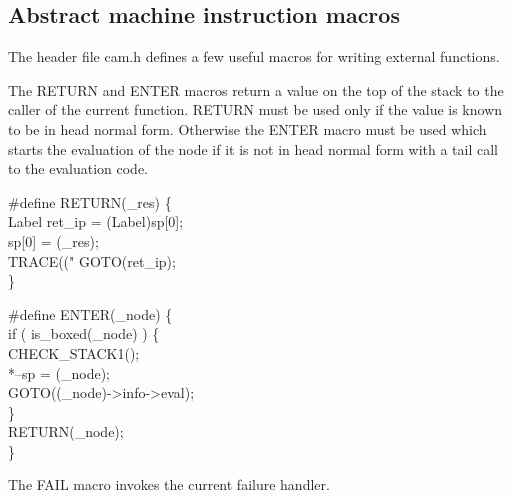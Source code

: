 %
%
\subsection{Abstract machine instruction macros}
The header file {\Tt{}cam.h\nwendquote} defines a few useful macros for writing
external functions.

\nwenddocs{}\nwdocspar
The {\Tt{}RETURN\nwendquote} and {\Tt{}ENTER\nwendquote} macros return a value on the top of the
stack to the caller of the current function. {\Tt{}RETURN\nwendquote} must be used
only if the value is known to be in head normal form. Otherwise the
{\Tt{}ENTER\nwendquote} macro must be used which starts the evaluation of the node
if it is not in head normal form with a tail call to the evaluation
code.

\nwenddocs{}\endmoddef\nwstartdeflinemarkup{}\nwenddeflinemarkup
#define RETURN(_res) \{ \\
    Label ret_ip = (Label)sp[0]; \\
    sp[0] = (_res); \\
    TRACE(("%
    GOTO(ret_ip); \\
\}

#define ENTER(_node) \{ \\
    if ( is_boxed(_node) ) \{ \\
        CHECK_STACK1(); \\
        *--sp = (_node); \\
        GOTO((_node)->info->eval); \\
    \} \\
    RETURN(_node); \\
\}

\nwendcode{}\nwdocspar
The {\Tt{}FAIL\nwendquote} macro invokes the current failure handler.

